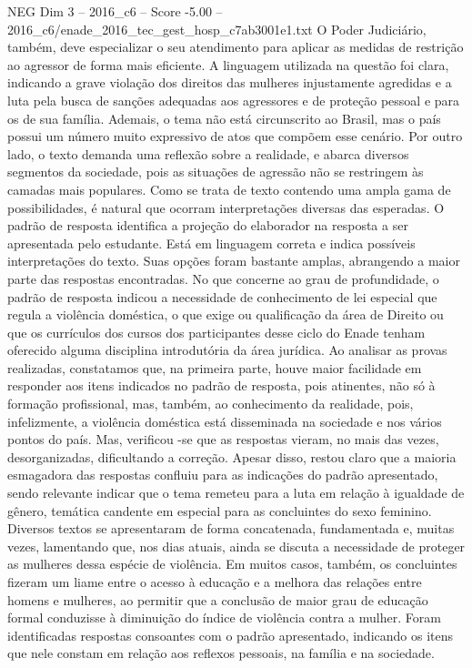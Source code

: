 \begin{textsample}{NEG Dim 3 – 2016\_c6 – Score -5.00 – 2016\_c6/enade\_2016\_tec\_gest\_hosp\_c7ab3001e1.txt}
O Poder Judiciário, também, deve especializar o seu atendimento para aplicar as medidas de restrição ao agressor de forma mais eficiente.
A linguagem utilizada na questão foi clara, indicando a grave violação dos direitos das mulheres injustamente agredidas e a luta pela busca de sanções adequadas aos agressores e de proteção pessoal e para os de sua família.
Ademais, o tema não está circunscrito ao Brasil, mas o país possui um número muito expressivo de atos que compõem esse cenário.
Por outro lado, o texto demanda uma reflexão sobre a realidade, e abarca diversos segmentos da sociedade, pois as situações de agressão não se restringem às camadas mais populares.
Como se trata de texto contendo uma ampla gama de possibilidades, é natural que ocorram interpretações diversas das esperadas.
O padrão de resposta identifica a projeção do elaborador na resposta a ser apresentada pelo estudante.
Está em linguagem correta e indica possíveis interpretações do texto.
Suas opções foram bastante amplas, abrangendo a maior parte das respostas encontradas.
No que concerne ao grau de profundidade, o padrão de resposta indicou a necessidade de conhecimento de lei especial que regula a violência doméstica, o que exige ou qualificação da área de Direito ou que os currículos dos cursos dos participantes desse ciclo do Enade tenham oferecido alguma disciplina introdutória da área jurídica.
Ao analisar as provas realizadas, constatamos que, na primeira parte, houve maior facilidade em responder aos itens indicados no padrão de resposta, pois atinentes, não só à formação profissional, mas, também, ao conhecimento da realidade, pois, infelizmente, a violência doméstica está disseminada na sociedade e nos vários pontos do país.
Mas, verificou -se que as respostas vieram, no mais das vezes, desorganizadas, dificultando a correção.
Apesar disso, restou claro que a maioria esmagadora das respostas confluiu para as indicações do padrão apresentado, sendo relevante indicar que o tema remeteu para a luta em relação à igualdade de gênero, temática candente em especial para as concluintes do sexo feminino.
Diversos textos se apresentaram de forma concatenada, fundamentada e, muitas vezes, lamentando que, nos dias atuais, ainda se discuta a necessidade de proteger as mulheres dessa espécie de violência.
Em muitos casos, também, os concluintes fizeram um liame entre o acesso à educação e a melhora das relações entre homens e mulheres, ao permitir que a conclusão de maior grau de educação formal conduzisse à diminuição do índice de violência contra a mulher.
Foram identificadas respostas consoantes com o padrão apresentado, indicando os itens que nele constam em relação aos reflexos pessoais, na família e na sociedade.

\end{textsample}

